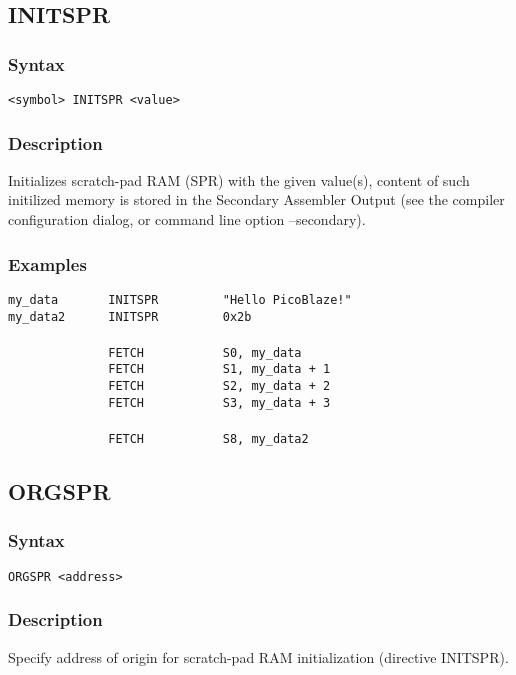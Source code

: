     \subsection{INITSPR}
        \subsubsection{Syntax}
            \verb'<symbol> INITSPR <value>'

        \subsubsection{Description}
            Initializes scratch-pad RAM (SPR) with the given value(s), content of such initilized memory is stored in the Secondary Assembler Output (see the compiler configuration dialog, or command line option --secondary).

        \subsubsection{Examples}
            \verb'my_data       INITSPR         "Hello PicoBlaze!"'\\
            \verb'my_data2      INITSPR         0x2b'\\
            \verb''\\
            \verb'              FETCH           S0, my_data'\\
            \verb'              FETCH           S1, my_data + 1'\\
            \verb'              FETCH           S2, my_data + 2'\\
            \verb'              FETCH           S3, my_data + 3'\\
            \verb''\\
            \verb'              FETCH           S8, my_data2'

    \subsection{ORGSPR}
        \subsubsection{Syntax}
            \verb'ORGSPR <address>'

        \subsubsection{Description}
            Specify address of origin for scratch-pad RAM initialization (directive INITSPR).

